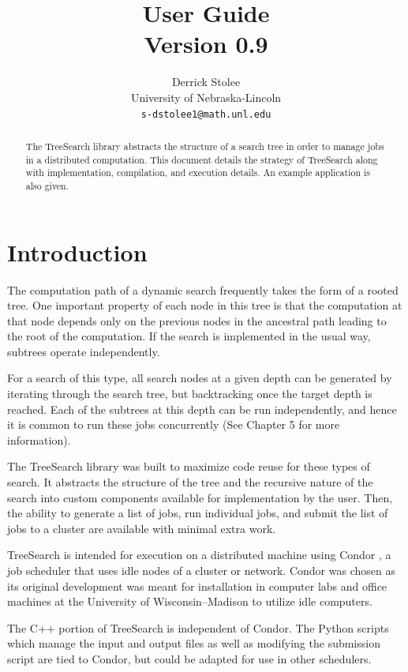 \documentclass[11pt]{article}
\title{{\TreeSearch} User Guide\\ {\large Version 0.9}}
\author{Derrick Stolee \\ 
	University of Nebraska-Lincoln\\ 
	\texttt{s-dstolee1@math.unl.edu}
       }
\def\TreeSearch{{TreeSearch}}
\begin{document}
\maketitle
\vspace{-.3in}
\begin{abstract}
	The {\TreeSearch} library abstracts the structure of a search tree
		in order to manage jobs in a distributed computation.
	This document details the strategy of {\TreeSearch} along with
		implementation, compilation, and execution details.
	An example application is also given.
\end{abstract}

\section{Introduction}
\label{sec:Introduction}

The computation path of a dynamic search frequently takes the form of a rooted tree.
One important property of each node in this tree is that the computation at that
	node depends only on the previous nodes in the ancestral path leading
	to the root of the computation.
If the search is implemented in the usual way, subtrees operate independently.

For a search of this type, all search nodes at a given depth 
	can be generated by iterating through the search tree, but 
	backtracking once the target depth is reached.
Each of the subtrees at this depth can be run independently,
	and hence it is common to run these jobs concurrently 
	(See \cite{ClassificationAlgorithms} Chapter 5 for more information).

The {\TreeSearch} library was built to maximize code reuse for these types of search.
It abstracts the structure of the tree and the recursive nature of the search into
	custom components available for implementation by the user.
Then, the ability to generate a list of jobs, run individual jobs, and submit the list
	of jobs to a cluster are available with minimal extra work.
	
{\TreeSearch} is intended for execution 
	on a distributed machine using
	Condor \cite{condor-practice},
	a job scheduler that uses idle nodes of a cluster or network.
Condor was chosen as its original development was meant for
	installation in computer labs and office machines 
	at the University of Wisconsin--Madison
	to utilize idle computers.
	
The C++ portion of {\TreeSearch} 
	is independent of Condor.
The Python scripts which manage the input and output files
	as well as modifying the submission script are
	tied to Condor, but 
	could be adapted for use in other schedulers.
\end{document}

